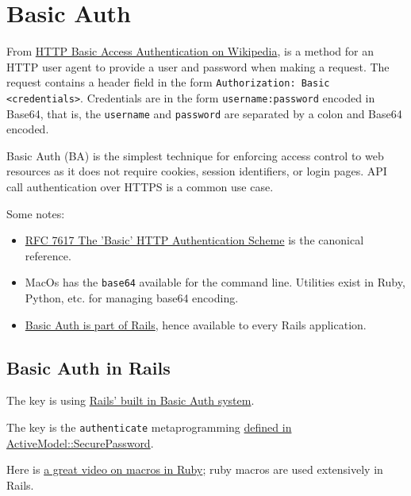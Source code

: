 \section{Basic Auth}

From \href{https://en.wikipedia.org/wiki/Basic_access_authentication}{%
  HTTP Basic Access Authentication on Wikipedia}, is a method for an HTTP
user agent to provide a user and password when making a request. The request
contains a header field in the form \texttt{Authorization: Basic
 <credentials>}. Credentials are in the form \texttt{username:password} encoded in
Base64, that is, the \texttt{username} and \texttt{password} are separated by a colon
and Base64 encoded.

Basic Auth (BA) is the simplest technique for enforcing access control to
web resources as it does not require cookies, session identifiers, or
login pages. API call authentication over HTTPS is a common use case.

Some notes:
\begin{itemize}
  \item \href{https://tools.ietf.org/html/rfc7617}{%
      RFC 7617 The 'Basic' HTTP Authentication Scheme} is the
    canonical reference.
  \item MacOs has the \texttt{base64} available for the command line. Utilities
    exist in Ruby, Python, etc. for managing base64 encoding.
  \item \href{https://api.rubyonrails.org/classes/ActionController/HttpAuthentication/Basic.html}{%
      Basic Auth is part of Rails}, hence available to every Rails application.
\end{itemize}

\subsection{Basic Auth in Rails}

The key is using \href{https://github.com/rails/rails/blob/master/actionpack/lib/action_controller/metal/http_authentication.rb}{%
Rails' built in Basic Auth system}.

The key is the \texttt{authenticate} metaprogramming
\href{https://github.com/rails/rails/blob/master/activemodel/lib/active_model/secure_password.rb#L119}{%
  defined in ActiveModel::SecurePassword}.

Here is \href{https://www.youtube.com/watch?v=O1sgFzn_Pgk}{%
a great video on macros in Ruby}; ruby macros are used extensively in Rails.

